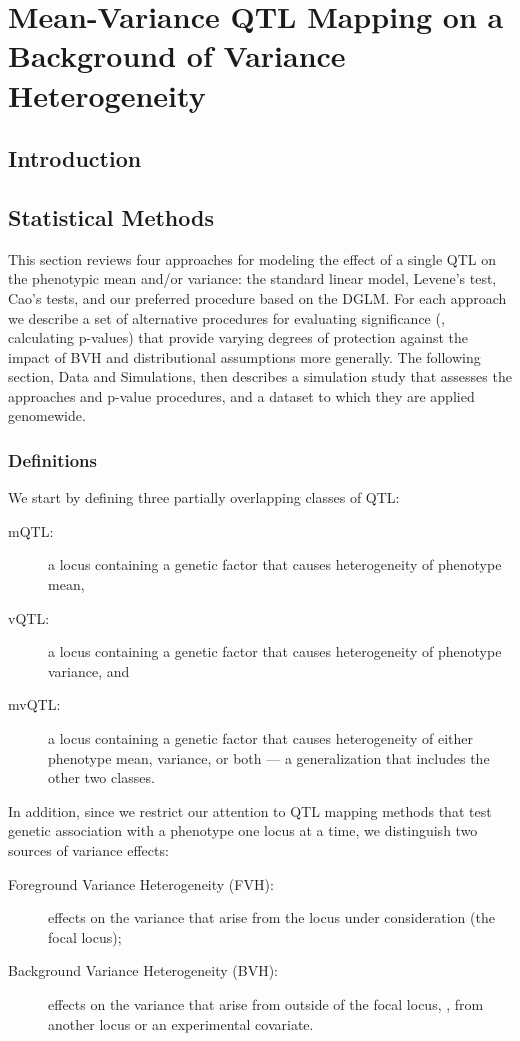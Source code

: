\chapter{Mean-Variance QTL Mapping on a Background of Variance Heterogeneity}
\label{chap:bvh}

\section{Introduction}



\section{Statistical Methods}

This section reviews four approaches for modeling the effect of a single QTL on the phenotypic mean and/or variance: the standard linear model, Levene's test, Cao's tests, and our preferred procedure based on the DGLM. For each approach we describe a set of alternative procedures for evaluating significance (\ie, calculating p-values) that provide varying degrees of protection against the impact of BVH and distributional assumptions more generally. 
The following section, Data and Simulations, then describes a simulation study that assesses the approaches and p-value procedures, and a dataset to which they are applied genomewide.

\subsection{Definitions}

  We start by defining three partially overlapping classes of QTL:
  \begin{description}
      \item[mQTL:] a locus containing a genetic factor that causes heterogeneity of phenotype mean,
      \item[vQTL:] a locus containing a genetic factor that causes heterogeneity of phenotype variance, and
      \item[mvQTL:] a locus containing a genetic factor that causes heterogeneity of either phenotype mean, variance, or both --- a generalization that includes the other two classes.
  \end{description}
  In addition, since we restrict our attention to QTL mapping methods that test genetic association with a phenotype one locus at a time, we distinguish two sources of variance effects:
  \begin{description}
    \item[Foreground Variance Heterogeneity (FVH):] effects on the variance that arise from the locus under consideration (the focal locus);
    \item[Background Variance Heterogeneity (BVH):] effects on the variance that arise from outside of the focal locus, \eg, from another locus or an experimental covariate.
  \end{description}

